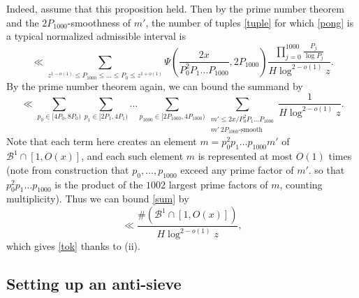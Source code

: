 \documentclass[12pt]{amsart}
\begin{document}
Indeed, assume that this proposition held.  Then by the prime number theorem and the $2P_{1000}$-smoothness of $m'$, the number of tuples \eqref{tuple} for which \eqref{pong} is a typical normalized admissible interval is
\begin{equation}\label{sum}
\ll \sum_{z^{1-o(1)} \leq P_{1000} \leq \dots \leq P_0 \leq z^{1+o(1)}} \Psi\left(\frac{2x }{ P_0^2 P_1 \dots P_{1000}}, 2P_{1000}\right) \frac{\prod_{j=0}^{1000} \frac{P_j}{\log P_j}}{H\log^{2-o(1)} z}.
\end{equation}
By the prime number theorem again, we can bound the summand by
$$ \ll  \sum_{p_0 \in [4P_0,8P_0)} \sum_{p_1 \in [2P_1,4P_1)} \dots \sum_{p_{1000} \in [2P_{1000},4P_{1000})} \sum_{\substack{m' \leq 2x/P_0^2 P_1 \dots P_{1000}\\ m'\ 2P_{1000}\text{-smooth}}} \frac{1}{H\log^{2-o(1)} z}.$$
Note that each term here creates an element $m = p_0^2 p_1 \dots p_{1000} m'$ of ${\mathcal B}^1 \cap [1,O(x)]$, and each such element $m$ is represented at most $O(1)$ times (note from construction that $p_0,\dots,p_{1000}$ exceed any prime factor of $m'$. so that $p_0^2 p_1 \dots p_{1000}$ is the product of the $1002$ largest prime factors of $m$, counting multiplicity).  Thus we can bound \eqref{sum} by
$$ \ll  \frac{ \# ({\mathcal B}^1 \cap [1,O(x)])}{H\log^{2-o(1)} z},$$
which gives \eqref{tok} thanks to (ii).

\subsection{Setting up an anti-sieve}
\end{document}
